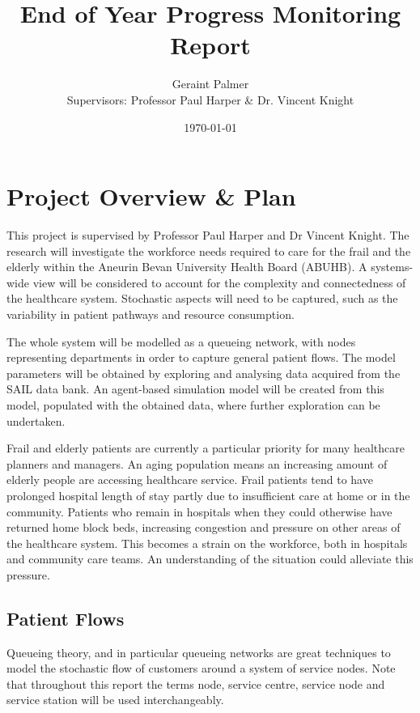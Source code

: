 \documentclass{article}
\title{End of Year Progress Monitoring Report}
\author{Geraint Palmer\\{\small Supervisors: Professor Paul Harper \& Dr. Vincent Knight}}
\date{\today}
\begin{document}
\onehalfspacing

\maketitle




\section{Project Overview \& Plan}

This project is supervised by Professor Paul Harper and Dr Vincent Knight. %
The research will investigate the workforce needs required to care for the frail and the elderly within the Aneurin Bevan University Health Board (ABUHB).
A systems-wide view will be considered to account for the complexity and connectedness of the healthcare system.
Stochastic aspects will need to be captured, such as the variability in patient pathways and resource consumption.

The whole system will be modelled as a queueing network, with nodes representing departments in order to capture general patient flows.
The model parameters will be obtained by exploring and analysing data acquired from the SAIL data bank.
An agent-based simulation model will be created from this model, populated with
the obtained data, where further exploration can be undertaken.

Frail and elderly patients are currently a particular priority for many healthcare planners and managers.
An aging population means an increasing amount of elderly people are accessing healthcare service.
Frail patients tend to have prolonged hospital length of stay partly due to insufficient care at home or in the community.
Patients who remain in hospitals when they could otherwise have returned home block beds, increasing congestion and pressure on other areas of the healthcare system.
This becomes a strain on the workforce, both in hospitals and community care teams.
An understanding of the situation could alleviate this pressure.

\subsection{Patient Flows}
Queueing theory, and in particular queueing networks are great techniques to model the stochastic flow of customers around a system of service nodes.
Note that throughout this report the terms node, service centre, service node and service station will be used interchangeably.
\end{document}
